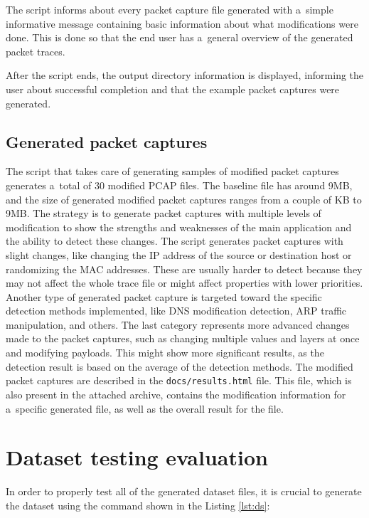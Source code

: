\documentclass[
  printed,     %
  color,       %
  oneside,     %
  nosansbold,  %
  nocolorbold, %
  nolof,         %
  nolot,         %
]{fithesis4}
\begin{document}
The script informs about every packet capture file generated with a~simple informative message containing basic information about what modifications were done. This is done so that the end user has a~general overview of the generated packet traces.

After the script ends, the output directory information is displayed, informing the user about successful completion and that the example packet captures were generated.

\subsection{Generated packet captures}

The script that takes care of generating samples of modified packet captures generates a~total of 30 modified PCAP files. The baseline file has around 9MB, and the size of generated modified packet captures ranges from a couple of KB to 9MB. The strategy is to generate packet captures with multiple levels of modification to show the strengths and weaknesses of the main application and the ability to detect these changes. The script generates packet captures with slight changes, like changing the IP address of the source or destination host or randomizing the MAC addresses. These are usually harder to detect because they may not affect the whole trace file or might affect properties with lower priorities. Another type of generated packet capture is targeted toward the specific detection methods implemented, like DNS modification detection, ARP traffic manipulation, and others. The last category represents more advanced changes made to the packet captures, such as changing multiple values and layers at once and modifying payloads. This might show more significant results, as the detection result is based on the average of the detection methods. The modified packet captures are described in the \texttt{docs/results.html} file. This file, which is also present in the attached archive, contains the modification information for a~specific generated file, as well as the overall result for the file.

\section{Dataset testing evaluation}

In order to properly test all of the generated dataset files, it is crucial to generate the dataset using the command shown in the Listing \ref{lst:ds}:
\end{document}
